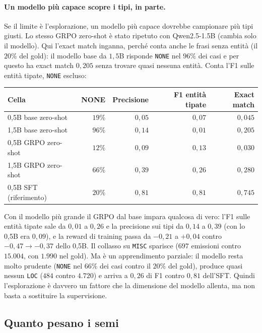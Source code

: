 \paragraph{Un modello più capace scopre i tipi, in parte.} Se il limite è
l'esplorazione, un modello più capace dovrebbe campionare più tipi giusti. Lo
stesso GRPO zero-shot è stato ripetuto con Qwen2.5-1.5B (cambia solo il
modello). Qui l'exact match inganna, perché conta anche le frasi senza entità
(il $20\%$ del gold): il modello base da $1{,}5$B risponde \texttt{NONE} nel
$96\%$ dei casi e per questo ha exact match $0{,}205$ senza trovare quasi
nessuna entità. Conta l'F1 sulle entità tipate, \texttt{NONE} escluso:

\begin{center}
\small
\begin{tabular}{lrrrr}
\toprule
Cella & NONE & Precisione & F1 entità tipate & Exact match \\
\midrule
0,5B base zero-shot  & $19\%$ & $0{,}05$ & $0{,}07$ & $0{,}045$ \\
1,5B base zero-shot  & $96\%$ & $0{,}14$ & $0{,}01$ & $0{,}205$ \\
0,5B GRPO zero-shot  & $12\%$ & $0{,}09$ & $0{,}13$ & $0{,}030$ \\
1,5B GRPO zero-shot  & $66\%$ & $0{,}39$ & $0{,}26$ & $0{,}280$ \\
0,5B SFT (riferimento) & $20\%$ & $0{,}81$ & $0{,}81$ & $0{,}745$ \\
\bottomrule
\end{tabular}
\end{center}

Con il modello più grande il GRPO dal base impara qualcosa di vero: l'F1 sulle
entità tipate sale da $0{,}01$ a $0{,}26$ e la precisione sui tipi da $0{,}14$ a
$0{,}39$ (con lo 0,5B era $0{,}09$), e la reward di training passa da $-0{,}21$ a
$+0{,}04$ contro $-0{,}47 \to -0{,}37$ dello 0,5B. Il collasso su
\texttt{MISC} sparisce ($697$ emissioni contro $15.004$, con $1.990$ nel gold).
Ma è un apprendimento parziale: il modello resta molto prudente (\texttt{NONE}
nel $66\%$ dei casi contro il $20\%$ del gold), produce quasi nessun
\texttt{LOC} ($484$ contro $4.720$) e arriva a $0{,}26$ di F1 contro $0{,}81$
dell'SFT. Quindi l'esplorazione è davvero un fattore che la dimensione del
modello allenta, ma non basta a sostituire la supervisione.

\subsection{Quanto pesano i semi}
\label{sec:semi-conll}

